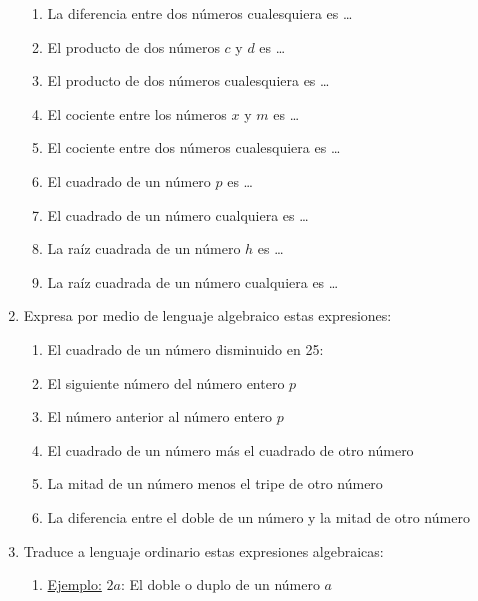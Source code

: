 \documentclass[10pt,twoside]{article}
\begin{document}
\begin{enumerate}
\begin{enumerate}
\item La diferencia entre dos números cualesquiera es \ldots
\item El producto de dos números $c$ y $d$ es \ldots
\item El producto de dos números cualesquiera es \ldots
\item El cociente entre los números $x$ y $m$ es \ldots
\item El cociente entre dos números cualesquiera es \ldots
\item El cuadrado de un número $p$ es \ldots
\item El cuadrado de un número cualquiera es \ldots
\item La raíz cuadrada de un número $h$ es \ldots
\item La raíz cuadrada de un número cualquiera es \ldots
\end{enumerate}
\item Expresa por medio de lenguaje algebraico estas expresiones:
\begin{enumerate}
\item El cuadrado de un número disminuido en 25: 
\item El siguiente número del número entero $p$
\item El número anterior al número entero $p$
\item El cuadrado de un número más el cuadrado de otro número
\item La mitad de un número menos el tripe de otro número
\item La diferencia entre el doble de un número y la mitad de otro número
\end{enumerate}
\item Traduce a lenguaje ordinario estas expresiones algebraicas:
\begin{enumerate}
\item \underline{Ejemplo:} $2a$: \; El doble o duplo de un número $a$
\end{enumerate}

\end{enumerate}
\end{document}
